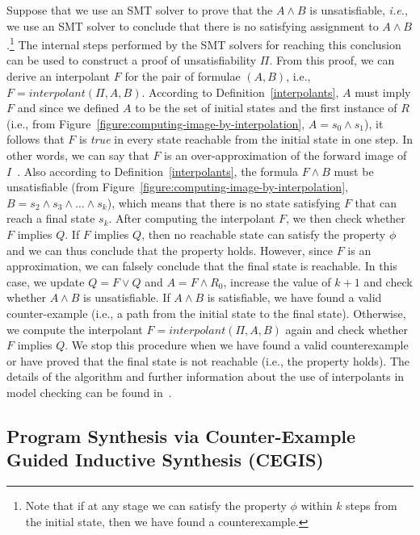 \documentclass[format=acmsmall, review=false, screen=true]{acmart}
\begin{document}
Suppose that we use an SMT solver to prove that the $A \wedge B$ is unsatisfiable, {\it i.e.}, we use an SMT solver to conclude that there is no satisfying assignment to $A \wedge B$.\footnote{Note that if at any stage we can satisfy the property $\phi$ within $k$ steps from the initial state, then we have found a counterexample.} The internal steps performed by the SMT solvers for reaching this conclusion can be used to construct a proof of unsatisfiability $\Pi$. From this proof, we can derive an interpolant $F$ for the pair of formulae $\left(A,B\right)$, i.e., $F = interpolant\left(\Pi, A, B\right)$. According to Definition~\ref{interpolants}, $A$ must imply $F$ and since we defined $A$ to be the set of initial states and the first instance of $R$ (i.e., from Figure~\ref{figure:computing-image-by-interpolation}, $A=s_{0} \wedge s_{1}$), it follows that $F$ is \textit{true} in every state reachable from the initial state in one step. In other words, we can say that $F$ is an over-approximation of the forward image of $I$~\cite{McMillan03,McMillan05}. Also according to Definition~\ref{interpolants}, the formula $F \wedge B$ must be unsatisfiable (from Figure~\ref{figure:computing-image-by-interpolation}, $B=s_{2} \wedge s_{3} \wedge \ldots \wedge s_{k}$), which means that there is no state satisfying $F$ that can reach a final state $s_k$. After computing the interpolant $F$, we then check whether $F$ implies $Q$. If $F$ implies $Q$, then no reachable state can satisfy the property $\phi$ and we can thus conclude that the property holds. However, since $F$ is an approximation, we can falsely conclude that the final state is reachable. In this case, we update $Q = F \vee Q$ and $A = F \wedge R_{0}$, increase the value of $k+1$ and check whether $A \wedge B$ is unsatisfiable. If $A \wedge B$ is satisfiable, we have found a valid counter-example (i.e., a path from the initial state to the final state). Otherwise, we compute the interpolant $F = interpolant\left(\Pi, A, B\right)$ again and check whether $F$ implies $Q$. We stop this procedure when we have found a valid counterexample or have proved that the final state is not reachable (i.e., the property holds). The details of the algorithm and further information about the use of interpolants in model checking can be found in~\cite{McMillan03,McMillan05,McMillan06,McMillan07}. 

\subsection{Program Synthesis via Counter-Example \\ Guided Inductive Synthesis (CEGIS)}
\end{document}

